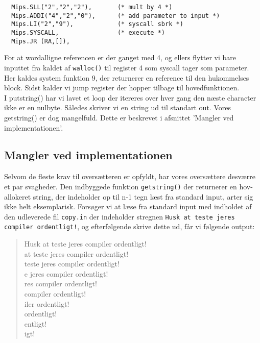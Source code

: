 \documentclass[12pt]{article}
\begin{document}
\begin{verbatim}
  Mips.SLL("2","2","2"),       (* mult by 4 *)   
  Mips.ADDI("4","2","0"),      (* add parameter to input *) 
  Mips.LI("2","9"),            (* syscall sbrk *)
  Mips.SYSCALL,                (* execute *)
  Mips.JR (RA,[]),
\end{verbatim}

For at wordalligne referencen er der ganget med 4, og ellers flytter vi bare
inputtet fra kaldet af \texttt{walloc()} til register 4 som syscall tager som
parameter. Her kaldes system funktion 9,
der returnerer en reference til den hukommelses block. Sidst kalder vi jump
register der hopper tilbage til hovedfunktionen.\\

I putstring() har vi lavet et loop der itereres over hver gang den næste
character ikke er en nulbyte. Således skriver vi en string ud til standart out.
Vores getstring() er dog mangelfuld. Dette er beskrevet i afsnittet 'Mangler ved
implementationen'.


\subsection{Mangler ved implementationen}

Selvom de fleste krav til oversætteren er opfyldt, har vores oversættere
desværre et par svagheder. Den indbyggede funktion \texttt{getstring()} der
returnerer en hov-allokeret string, der indeholder op til n-1 tegn læst fra
standard input, arter sig ikke helt eksemplarisk. Forsøger vi at læse fra
standard input med indholdet af den udleverede fil \texttt{copy.in} der
indeholder stregnen \texttt{Husk at teste jeres compiler ordentligt!}, og
efterfølgende skrive dette ud, får vi følgende output:\\

\begin{quote}
Husk at teste jeres compiler ordentligt! \\
 at teste jeres compiler ordentligt! \\
teste jeres compiler ordentligt! \\
e jeres compiler ordentligt! \\
res compiler ordentligt! \\	
compiler ordentligt! \\
iler ordentligt! \\
 ordentligt! \\
entligt!\\
igt!
\end{quote}
\end{document}
